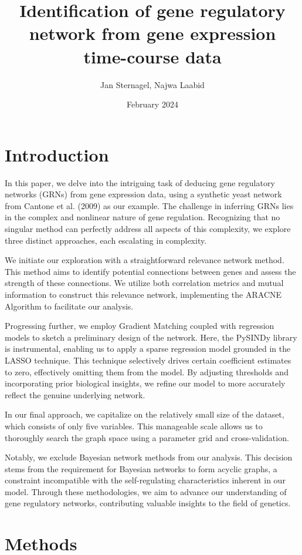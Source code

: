 \documentclass{article}
\title{Identification  of  gene  regulatory  network  from  gene
expression time-course data}
\author{Jan Sternagel, Najwa Laabid}
\date{February 2024}
\begin{document}
\maketitle

\section{Introduction}

In this paper, we delve into the intriguing task of deducing gene regulatory networks (GRNs) from gene expression data, using a synthetic yeast network from Cantone et al. (2009) as our example. The challenge in inferring GRNs lies in the complex and nonlinear nature of gene regulation. Recognizing that no singular method can perfectly address all aspects of this complexity, we explore three distinct approaches, each escalating in complexity.

We initiate our exploration with a straightforward relevance network method. This method aims to identify potential connections between genes and assess the strength of these connections. We utilize both correlation metrics and mutual information to construct this relevance network, implementing the ARACNE Algorithm to facilitate our analysis.

Progressing further, we employ Gradient Matching coupled with regression models to sketch a preliminary design of the network. Here, the PySINDy library is instrumental, enabling us to apply a sparse regression model grounded in the LASSO technique\cite{de2020pysindy}. This technique selectively drives certain coefficient estimates to zero, effectively omitting them from the model. By adjusting thresholds and incorporating prior biological insights, we refine our model to more accurately reflect the genuine underlying network.

In our final approach, we capitalize on the relatively small size of the dataset, which consists of only five variables. This manageable scale allows us to thoroughly search the graph space using a parameter grid and cross-validation.

Notably, we exclude Bayesian network methods from our analysis. This decision stems from the requirement for Bayesian networks to form acyclic graphs, a constraint incompatible with the self-regulating characteristics inherent in our model. Through these methodologies, we aim to advance our understanding of gene regulatory networks, contributing valuable insights to the field of genetics.

\section{Methods}
\end{document}
